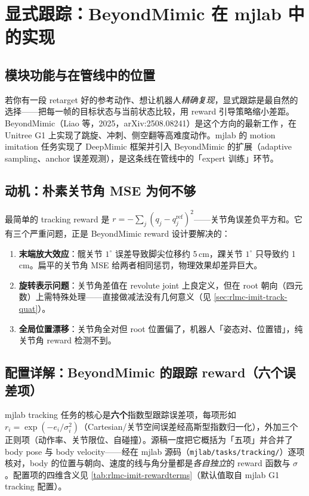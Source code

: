\section{显式跟踪：BeyondMimic 在 mjlab 中的实现}
\label{sec:rlmc-imit-track}

\subsection{模块功能与在管线中的位置}
\label{sec:rlmc-imit-track-pos}

若你有一段 retarget 好的参考动作、想让机器人\emph{精确复现}，显式跟踪是最自然的选择——把每一帧的目标状态与当前状态比较，用 reward 引导策略缩小差距。BeyondMimic（Liao 等，2025，arXiv:2508.08241）是这个方向的最新工作\,\cite{liao2025beyondmimic}，在 Unitree G1 上实现了跳旋、冲刺、侧空翻等高难度动作。mjlab 的 motion imitation 任务实现了 DeepMimic 框架并引入 BeyondMimic 的扩展（adaptive sampling、anchor 误差观测），是这条线在管线中的「expert 训练」环节。

\subsection{动机：朴素关节角 MSE 为何不够}
\label{sec:rlmc-imit-track-naive}

最简单的 tracking reward 是 $r=-\sum_j (q_j-q_j^{\text{ref}})^2$——关节角误差负平方和。它有三个严重问题，正是 BeyondMimic reward 设计要解决的：

\begin{enumerate}
  \item \textbf{末端放大效应}：髋关节 $1^\circ$ 误差导致脚尖位移约 5\,cm，踝关节 $1^\circ$ 只导致约 1\,cm。扁平的关节角 MSE 给两者相同惩罚，物理效果却差异巨大。
  \item \textbf{旋转表示问题}：关节角差值在 revolute joint 上良定义，但在 root 朝向（四元数）上需特殊处理——直接做减法没有几何意义（见 \cref{sec:rlmc-imit-track-quat}）。
  \item \textbf{全局位置漂移}：关节角全对但 root 位置偏了，机器人「姿态对、位置错」，纯关节角 reward 检测不到。
\end{enumerate}

\subsection{配置详解：BeyondMimic 的跟踪 reward（六个误差项）}
\label{sec:rlmc-imit-track-reward}

mjlab tracking 任务的核心是\textbf{六个}指数型跟踪误差项，每项形如 $r_i=\exp(-e_i/\sigma_i^2)$（Cartesian/关节空间误差经高斯型指数归一化），外加三个正则项（动作率、关节限位、自碰撞）。源稿一度把它概括为「五项」并合并了 body pose 与 body velocity——经在 mjlab 源码（\texttt{mjlab/tasks/tracking/}）逐项核对，body 的位置与朝向、速度的线与角分量都是\emph{各自独立}的 reward 函数与 $\sigma$。配置项的四维含义见 \cref{tab:rlmc-imit-rewardterms}（默认值取自 mjlab G1 tracking 配置）。

